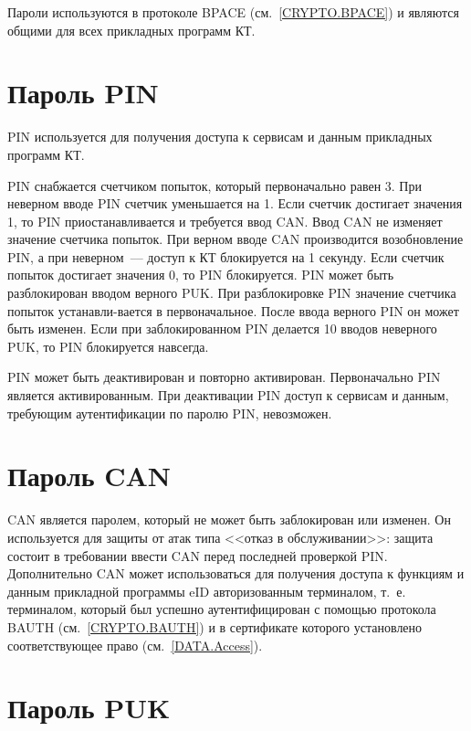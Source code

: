 Пароли используются в протоколе BPACE (см.~\ref{CRYPTO.BPACE})
и являются общими для всех прикладных программ КТ.

\section{Пароль PIN}\label{OBJ.PIN}

PIN используется для получения доступа к сервисам и данным прикладных 
программ КТ. 


PIN снабжается счетчиком попыток, который первоначально равен 3. При 
неверном вводе PIN счетчик уменьшается на 1. Если счетчик достигает 
значения 1, то PIN приостанавливается и требуется ввод CAN. Ввод CAN не 
изменяет значение счетчика попыток. При верном вводе CAN производится 
возобновление PIN, а при неверном~--- доступ к КТ блокируется на 1 секунду.
Если счетчик попыток достигает значения 0, то PIN 
блокируется. PIN может быть разблокирован вводом верного PUK. При 
разблокировке PIN значение счетчика попыток устанавли-вается в 
первоначальное. После ввода верного PIN он может быть изменен. Если при 
заблокированном PIN делается 10 вводов неверного PUK, то PIN блокируется 
навсегда. 

PIN может быть деактивирован и повторно активирован.
Первоначально PIN является активированным. При деактивации
PIN доступ к сервисам и данным, требующим аутентификации 
по паролю PIN, невозможен.

\section{Пароль CAN}\label{OBJ.CAN}

CAN является паролем, который не 
может быть заблокирован или изменен. Он используется для защиты от атак 
типа <<отказ в обслуживании>>: защита состоит в требовании ввести CAN перед 
последней проверкой PIN. Дополнительно CAN может использоваться для 
получения доступа к функциям и данным прикладной программы eID 
авторизованным терминалом, т.~е. терминалом, который был успешно 
аутентифицирован с помощью протокола BAUTH (см.~\ref{CRYPTO.BAUTH}) и в 
сертификате которого установлено соответствующее право (см.~\ref{DATA.Access}). 

\section{Пароль PUK}\label{OBJ.PUK}

